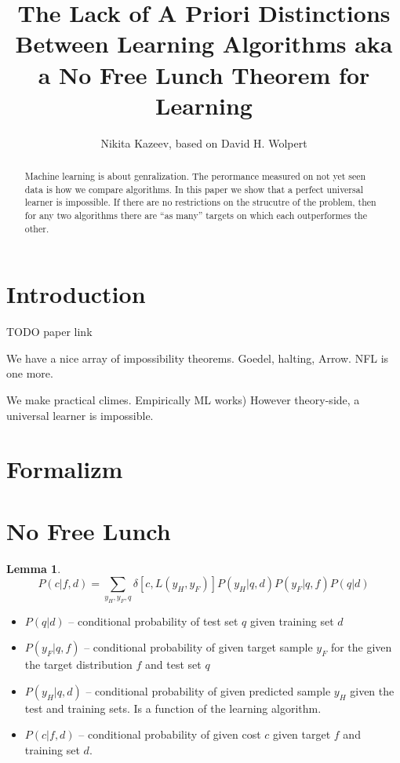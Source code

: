 \documentclass[a4paper]{article}
\title{The Lack of A Priori Distinctions Between Learning Algorithms aka
a No Free Lunch Theorem for Learning}
\author{Nikita Kazeev, based on David H. Wolpert}
\newtheorem{lemma}[theorem]{Lemma}
\begin{document}
\maketitle
\begin{abstract}
  Machine learning is about genralization. The perormance measured on
  not yet seen data is how we compare algorithms. In this paper we
  show that a perfect universal learner is impossible. If there are no
  restrictions on the strucutre of the problem, then for any two
  algorithms there are ``as many'' targets on which each outperformes
  the other.
\end{abstract}

\section{Introduction}

TODO paper link

We have a nice array of impossibility theorems. Goedel, halting,
Arrow. NFL is one more. 

We  make practical climes. Empirically ML works) However
theory-side, a universal learner is impossible.

\section{Formalizm}

\section{No Free Lunch}
\begin{lemma}

\begin{equation}
  P(c|f,d) = \sum_{y_H,y_F,q}\delta\left[c,L\left(y_H, y_F\right)\right] P\left(y_H|q, d\right)
  P\left(y_F| q, f\right)P\left(q|d\right)
\end{equation}
\end{lemma}

\begin{itemize}
\item $P\left(q|d\right)$ -- conditional probability of test set $q$ given training set $d$
\item $P\left(y_F| q, f\right)$ -- conditional probability of given
  target sample $y_F$ for the given the target distribution $f$ and
  test set $q$
\item $P\left(y_H|q, d\right)$ -- conditional probability of given
  predicted sample $y_H$ given the test and training sets. Is a
  function of the learning algorithm.
\item $P(c|f,d)$ -- conditional probability of given cost $c$ given
  target $f$ and training set $d$.
\end{itemize}
\end{document}
